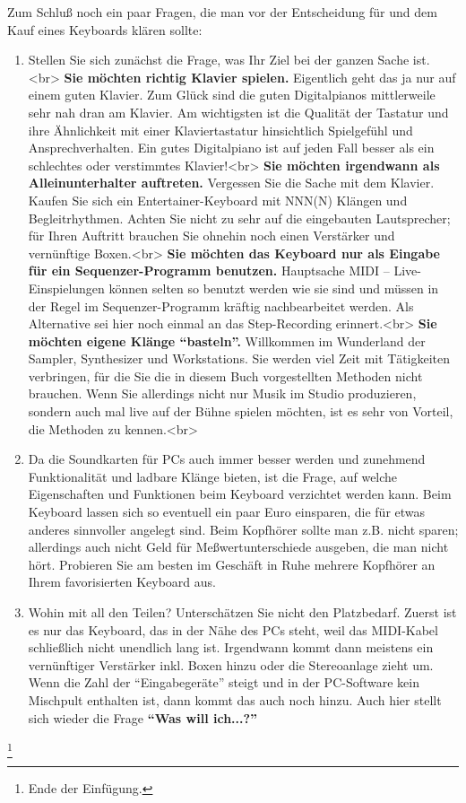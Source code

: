 \label{kauf}

Zum Schluß noch ein paar Fragen, die man vor der Entscheidung für und dem Kauf eines Keyboards klären sollte:

\begin{enumerate}[label={\arabic*.}] 
\item Stellen Sie sich zunächst die Frage, was Ihr Ziel bei der ganzen Sache ist.<br>
\textbf{Sie möchten richtig Klavier spielen.} Eigentlich geht das ja nur auf einem guten Klavier.
Zum Glück sind die guten Digitalpianos mittlerweile sehr nah dran am Klavier.
Am wichtigsten ist die Qualität der Tastatur und ihre Ähnlichkeit mit einer Klaviertastatur hinsichtlich Spielgefühl und Ansprechverhalten.
Ein gutes Digitalpiano ist auf jeden Fall besser als ein schlechtes oder verstimmtes Klavier!<br>
\textbf{Sie möchten irgendwann als Alleinunterhalter auftreten.}
Vergessen Sie die Sache mit dem Klavier.
Kaufen Sie sich ein Entertainer-Keyboard mit NNN(N) Klängen und Begleitrhythmen.
Achten Sie nicht zu sehr auf die eingebauten Lautsprecher; für Ihren Auftritt brauchen Sie ohnehin noch einen Verstärker und vernünftige Boxen.<br>
\textbf{Sie möchten das Keyboard nur als Eingabe für ein Sequenzer-Programm benutzen.} Hauptsache MIDI --  Live-Einspielungen können selten so benutzt werden wie sie sind und müssen in der Regel im Sequenzer-Programm kräftig nachbearbeitet werden.
Als Alternative sei hier noch einmal an das Step-Recording erinnert.<br>
\textbf{Sie möchten eigene Klänge \enquote{basteln}.} Willkommen im Wunderland der Sampler, Synthesizer und Workstations.
Sie werden viel Zeit mit Tätigkeiten verbringen, für die Sie die in diesem Buch vorgestellten Methoden nicht brauchen.
Wenn Sie allerdings nicht nur Musik im Studio produzieren, sondern auch mal live auf der Bühne spielen möchten, ist es sehr von Vorteil, die Methoden zu kennen.<br>


\item Da die Soundkarten für PCs auch immer besser werden und zunehmend Funktionalität und ladbare Klänge bieten, ist die Frage, auf welche Eigenschaften und Funktionen beim Keyboard verzichtet werden kann.
Beim Keyboard lassen sich so eventuell ein paar Euro einsparen, die für etwas anderes sinnvoller angelegt sind.
Beim Kopfhörer sollte man z.B. nicht sparen; allerdings auch nicht Geld für Meßwertunterschiede ausgeben, die man nicht hört.
Probieren Sie am besten im Geschäft in Ruhe mehrere Kopfhörer an Ihrem favorisierten Keyboard aus.


\item Wohin mit all den Teilen? Unterschätzen Sie nicht den Platzbedarf.
Zuerst ist es nur das Keyboard, das in der Nähe des PCs steht, weil das MIDI-Kabel schließlich nicht unendlich lang ist.
Irgendwann kommt dann meistens ein vernünftiger Verstärker inkl. Boxen hinzu oder die Stereoanlage zieht um.
Wenn die Zahl der \enquote{Eingabegeräte} steigt und in der PC-Software kein Mischpult enthalten ist, dann kommt das auch noch hinzu.
Auch hier stellt sich wieder die Frage \textbf{\enquote{Was will ich...?}}


 \end{enumerate}
\footnote{Ende der Einfügung.}



